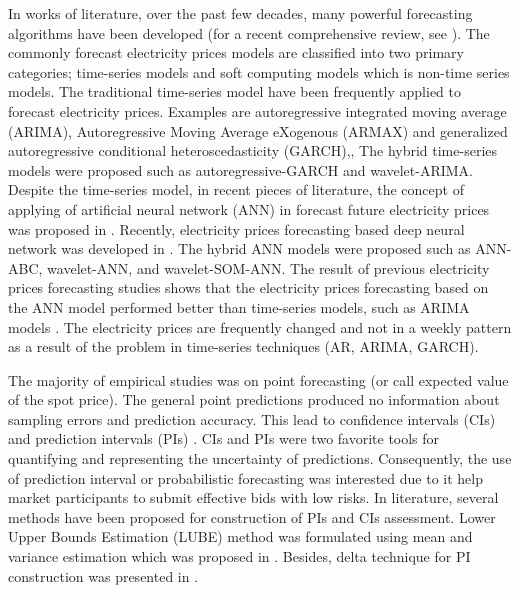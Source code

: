 \documentclass[review]{elsarticle}
\begin{document}

    In works of literature, over the past few decades, many powerful forecasting algorithms have been developed (for a recent comprehensive review, see \cite{Weron2014}).
    The commonly forecast electricity prices models are classified into two primary categories; time-series models and soft computing models which is non-time series models.
    The traditional time-series model have been frequently applied to forecast electricity prices. Examples are autoregressive integrated moving average (ARIMA)\cite{1216141}, Autoregressive Moving Average eXogenous (ARMAX)\cite{7917305} and generalized autoregressive conditional heteroscedasticity (GARCH)\cite{4344162},\cite{1627232},
    The hybrid time-series models were proposed such as autoregressive-GARCH\cite{Girish2016} and wavelet-ARIMA\cite{1425601}.
    Despite the time-series model, in recent pieces of literature, the concept of applying of artificial neural network (ANN) in forecast future electricity prices was proposed in \cite{Catalao2007}.
    Recently, electricity prices forecasting based deep neural network was developed in \cite{Kuo2018}.
    The hybrid ANN models were proposed such as ANN-ABC\cite{Chaweewat2017}, wavelet-ANN\cite{Bento2018}, and wavelet-SOM-ANN\cite{NAZAR2018214}.
    The result of previous electricity prices forecasting studies shows that the electricity prices forecasting based on the ANN model performed better than time-series models, such as ARIMA models \cite{Keles2016}.
    The electricity prices are frequently changed and not in a weekly pattern as a result of the problem in time-series techniques (AR, ARIMA, GARCH)\cite{4077090}.

    The majority of empirical studies was on point forecasting (or call expected value of the spot price).
    The general point predictions produced no information about sampling errors and prediction accuracy.
    This lead to confidence intervals (CIs) and prediction intervals (PIs) \cite{Weron2014}.
    CIs and PIs were two favorite tools for quantifying and representing the uncertainty of predictions.
    Consequently, the use of prediction interval or probabilistic forecasting was interested due to it help market participants to submit effective bids with low risks.
    In literature, several methods have been proposed for construction of PIs and CIs assessment.
    Lower Upper Bounds Estimation (LUBE) method was formulated using mean and variance estimation which was proposed in \cite{Khosravi2011}.
    Besides, delta technique for PI construction was presented in \cite{KhosraviA2010}.
\end{document}
